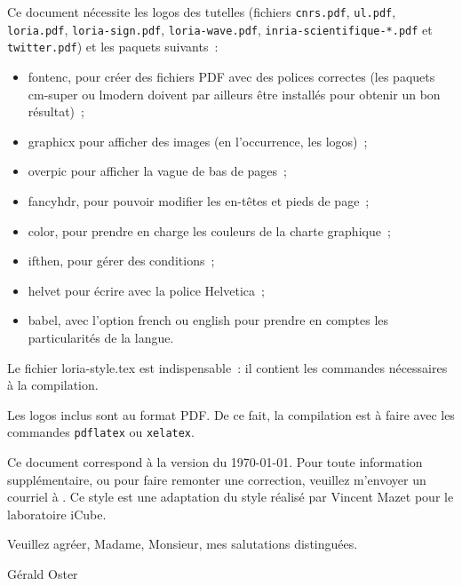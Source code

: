 \documentclass[a4paper,11pt]{letter}
\begin{document}
\bigskip

Ce document nécessite les logos des tutelles (fichiers \texttt{cnrs.pdf}, \texttt{ul.pdf}, \texttt{loria.pdf}, \texttt{loria-sign.pdf}, \texttt{loria-wave.pdf},  \texttt{inria-scientifique-*.pdf} et \texttt{twitter.pdf}) et les paquets suivants~:
\begin{itemize}
  
  \item fontenc, pour créer des fichiers PDF avec des polices correctes
  (les paquets cm-super ou lmodern doivent par ailleurs être installés pour obtenir un bon résultat)~;

  \item graphicx pour afficher des images (en l'occurrence, les logos)~;
  
  \item overpic pour afficher la vague de bas de pages~;

  \item fancyhdr, pour pouvoir modifier les en-têtes et pieds de page~;

  \item color, pour prendre en charge les couleurs de la charte graphique~;

  \item ifthen, pour gérer des conditions~;

  \item helvet pour écrire avec la police Helvetica~;

  \item babel, avec l'option french ou english pour prendre en comptes les particularités de la langue.

\end{itemize}
Le fichier loria-style.tex est indispensable~: il contient les commandes nécessaires à la compilation.

\bigskip

Les logos inclus sont au format PDF. De ce fait, la compilation est à faire avec les commandes \texttt{pdflatex} ou \texttt{xelatex}.

\bigskip

Ce document correspond à la version du \today.
Pour toute information supplémentaire, ou pour faire remonter une correction, veuillez m'envoyer un courriel à . Ce style est une adaptation du style réalisé par Vincent Mazet pour le laboratoire iCube.

\bigskip

Veuillez agréer, Madame, Monsieur, mes salutations distinguées.

\bigskip\bigskip

\hfill Gérald Oster
\end{document}
